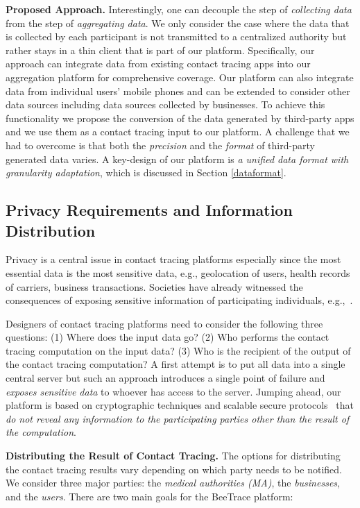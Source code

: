 \documentclass[11pt]{article}  %
\newcommand{\sysname}{\textsf{BeeTrace}\xspace}
\begin{document}
\textbf{Proposed Approach.} Interestingly, one can decouple the step of \emph{collecting data} from the step of \emph{aggregating data}. 
We only consider the case where the data that is collected by each participant is not transmitted to a centralized authority but rather stays in a thin client that is part of our platform. 
Specifically, our approach can integrate data from existing contact tracing apps into our aggregation platform for comprehensive coverage. 
Our platform can also integrate data from individual users' mobile phones and can be extended to consider other data sources including data sources collected by businesses. To achieve this functionality we propose the conversion of the data generated by third-party apps and we use them as a contact tracing input to our platform. A challenge that we had to overcome is that both the \emph{precision} and the \emph{format} of third-party generated data varies.
A key-design of our platform is \emph{a unified data format with granularity adaptation}, which is discussed in Section \ref{dataformat}.

\subsection{Privacy Requirements and Information Distribution}
\label{options}
Privacy is a central issue in contact tracing platforms especially since the most essential data is the most sensitive data, e.g., geolocation of users, health records of carriers, business transactions. 
Societies have already witnessed the consequences of exposing sensitive information of participating individuals, e.g.,~\cite{south-korea-privacy}. 

Designers of contact tracing platforms need to consider the following three questions: (1) Where does the input data go? (2) Who performs the contact tracing computation on the input data? (3) Who is the recipient of the output of the contact tracing computation?
A first attempt is to put all data into a single central server but such an approach introduces a single point of failure and  \emph{exposes sensitive data} to whoever has access to the server. 
Jumping ahead, our platform is based on cryptographic techniques and scalable secure protocols~\cite{pet18, Kales2019, SOda19} that \emph{do not reveal any information to the participating parties other than the result of the computation}.

\textbf{Distributing the Result of Contact Tracing.} %
The options for distributing the contact tracing results vary depending on which party needs to be notified. 
We consider three major parties: the \emph{medical authorities (MA)}, the \emph{businesses}, and the \emph{users}. There are two main goals for the \sysname platform:  
\end{document}
